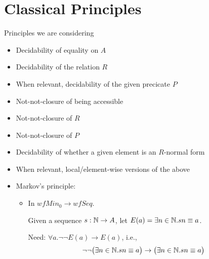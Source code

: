 \documentclass{scrartcl}
\begin{document}
\section{Classical Principles}
Principles we are considering
\begin{itemize}
  \item Decidability of equality on $A$
  \item Decidability of the relation $R$
  \item When relevant, decidability of the given precicate $P$
  \item Not-not-closure of being accessible
  \item Not-not-closure of $R$
  \item Not-not-closure of $P$
  \item Decidability of whether a given element is an $R$-normal form
  \item When relevant, local/element-wise versions of the above
  \item Markov's principle:
  \begin{itemize}
    \item In $wfMin_0 \to wfSeq$.

    Given a sequence $s : \mathbb{N} \to A$, let $E(a) = \exists n \in \mathbb{N}. s n \equiv a$.

    Need: $\forall a. \lnot\lnot E(a) \to E(a)$, i.e.,
    \[\lnot\lnot \big(\exists n \in \mathbb{N}. s n \equiv a\big)
          \to \big(\exists n \in \mathbb{N}. s n \equiv a\big)\]

  \end{itemize}
\end{itemize}
\end{document}
